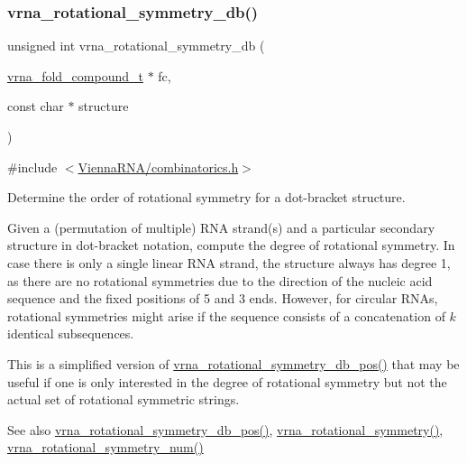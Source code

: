 \subsubsection{\texorpdfstring{vrna\+\_\+rotational\+\_\+symmetry\+\_\+db()}{vrna\_rotational\_symmetry\_db()}}
{\footnotesize\ttfamily unsigned int vrna\+\_\+rotational\+\_\+symmetry\+\_\+db (\begin{DoxyParamCaption}\item[{\hyperlink{group__fold__compound_ga1b0cef17fd40466cef5968eaeeff6166}{vrna\+\_\+fold\+\_\+compound\+\_\+t} $\ast$}]{fc,  }\item[{const char $\ast$}]{structure }\end{DoxyParamCaption})}



{\ttfamily \#include $<$\hyperlink{combinatorics_8h}{Vienna\+R\+N\+A/combinatorics.\+h}$>$}



Determine the order of rotational symmetry for a dot-\/bracket structure. 

Given a (permutation of multiple) R\+NA strand(s) and a particular secondary structure in dot-\/bracket notation, compute the degree of rotational symmetry. In case there is only a single linear R\+NA strand, the structure always has degree 1, as there are no rotational symmetries due to the direction of the nucleic acid sequence and the fixed positions of 5\textquotesingle{} and 3\textquotesingle{} ends. However, for circular R\+N\+As, rotational symmetries might arise if the sequence consists of a concatenation of $k$ identical subsequences.

This is a simplified version of \hyperlink{group__combinatorics__utils_ga2a4227ebe28dbc7ad55444a3a1bf7119}{vrna\+\_\+rotational\+\_\+symmetry\+\_\+db\+\_\+pos()} that may be useful if one is only interested in the degree of rotational symmetry but not the actual set of rotational symmetric strings.

\begin{DoxySeeAlso}{See also}
\hyperlink{group__combinatorics__utils_ga2a4227ebe28dbc7ad55444a3a1bf7119}{vrna\+\_\+rotational\+\_\+symmetry\+\_\+db\+\_\+pos()}, \hyperlink{group__combinatorics__utils_gae1dec02c4b63f303ce06a9293d316762}{vrna\+\_\+rotational\+\_\+symmetry()}, \hyperlink{group__combinatorics__utils_gac51464b5281833a58c25f9447252c495}{vrna\+\_\+rotational\+\_\+symmetry\+\_\+num()}
\end{DoxySeeAlso}

